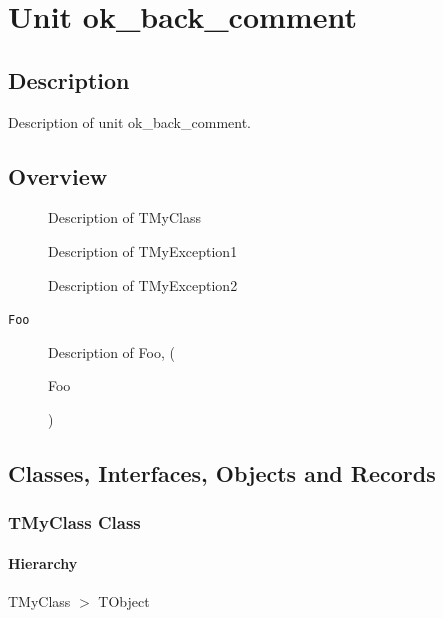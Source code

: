 \documentclass{report}
\newif\ifpdf
\begin{document}
\label{toc}\tableofcontents
\newpage
\newlength{\tmplength}
\chapter{Unit ok{\_}back{\_}comment}
\label{ok_back_comment}
\section{Description}
Description of unit ok{\_}back{\_}comment.
\section{Overview}
\begin{description}
\item[\texttt{\begin{ttfamily}TMyClass\end{ttfamily} Class}]Description of TMyClass
\item[\texttt{\begin{ttfamily}TMyException1\end{ttfamily} Class}]Description of TMyException1
\item[\texttt{\begin{ttfamily}TMyException2\end{ttfamily} Class}]Description of TMyException2
\end{description}
\begin{description}
\item[\texttt{Foo}]Description of Foo, (\begin{ttfamily}Foo\end{ttfamily})
\end{description}
\section{Classes, Interfaces, Objects and Records}
\ifpdf
\subsection*{\large{\textbf{TMyClass Class}}\normalsize\hspace{1ex}\hrulefill}
\else
\subsection*{TMyClass Class}
\fi
\label{ok_back_comment.TMyClass}
\subsubsection*{\large{\textbf{Hierarchy}}\normalsize\hspace{1ex}\hfill}
TMyClass {$>$} TObject
\end{document}
